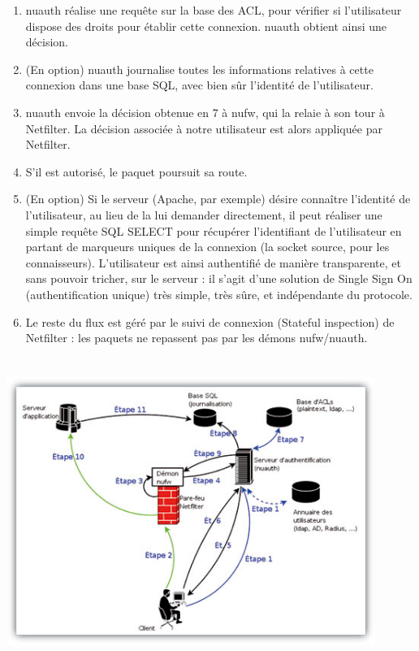\documentclass[12pt]{report}
\begin{document}
\begin{itemize}
\begin{enumerate}
  \\
  \item nuauth réalise une requête sur la base des ACL, pour vérifier si l’utilisateur dispose des droits pour établir cette connexion. nuauth obtient ainsi une décision.
  \\
  \item (En option) nuauth journalise toutes les informations relatives à cette connexion dans une base SQL, avec bien sûr l’identité de l’utilisateur.
  \\
  \item nuauth envoie la décision obtenue en 7 à nufw, qui la relaie à son tour à Netfilter. La décision associée à notre utilisateur est alors appliquée par Netfilter.
  \\
  \item S’il est autorisé, le paquet poursuit sa route.
  \\
  \item (En option) Si le serveur (Apache, par exemple) désire connaître l’identité de l’utilisateur, au lieu de la lui demander directement, il peut réaliser une simple requête SQL SELECT pour récupérer l’identifiant de l’utilisateur en partant de marqueurs uniques de la connexion (la socket source, pour les connaisseurs). L’utilisateur est ainsi authentifié de manière transparente, et sans pouvoir tricher, sur le serveur : il s’agit d’une solution de Single Sign On (authentification unique) très simple, très sûre, et indépendante du protocole.
  \\
  \item Le reste du flux est géré par le suivi de connexion (Stateful inspection) de Netfilter : les paquets ne repassent pas par les démons nufw/nuauth.
\end{enumerate}
\begin{center}
  \includegraphics[width=12cm,height=10cm]{images/algo.jpg}
\end{center}


\end{itemize}
\end{document}

